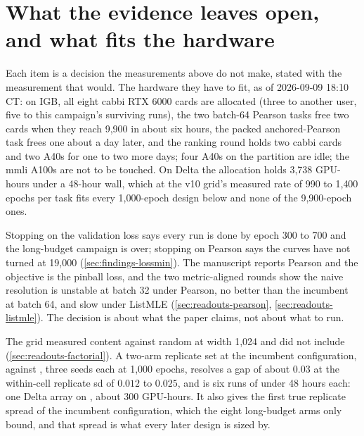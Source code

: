 
\section{What the evidence leaves open, and what fits the hardware}
\label{sec:next}

Each item is a decision the measurements above do not make, stated with the measurement
that would. The hardware they have to fit, as of 2026-09-09 18:10 CT: on IGB, all eight
cabbi RTX 6000 cards are allocated (three to another user, five to this campaign's
surviving runs), the two batch-64 Pearson tasks free two cards when they reach 9{,}900 in
about six hours, the packed anchored-Pearson task frees one about a day later, and the
ranking round holds two cabbi cards and two A40s for one to two more days; four A40s on
the  partition are idle; the mmli A100s are not to be touched. On Delta the
 allocation holds 3{,}738 GPU-hours under a 48-hour wall, which at the v10
grid's measured rate of 990 to 1{,}400 epochs per task fits every 1{,}000-epoch design
below and none of the 9{,}900-epoch ones.

 Stopping on the validation loss says every run is done
by epoch 300 to 700 and the long-budget campaign is over; stopping on Pearson says the
curves have not turned at 19,000 (\cref{sec:findings-lossmin}). The manuscript reports
Pearson and the objective is the pinball loss, and the two metric-aligned rounds show the
naive resolution is unstable at batch 32 under Pearson, no better than the incumbent at
batch 64, and slow under ListMLE (\cref{sec:readouts-pearson},
\cref{sec:readouts-listmle}). The decision is about what the paper claims, not about what
to run.

 The grid measured content against random at width 1{,}024 and did not
include  (\cref{sec:readouts-factorial}). A two-arm replicate set at the
incumbent configuration,  against , three seeds each at
1{,}000 epochs, resolves a gap of about $0.03$ at the within-cell replicate sd of $0.012$
to $0.025$, and is six runs of under 48 hours each: one Delta array on , about
300 GPU-hours. It also gives the first true replicate spread of the incumbent
configuration, which the eight long-budget arms only bound, and that spread is what every
later design is sized by.

